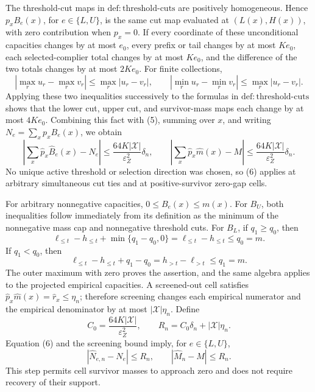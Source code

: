 The threshold-cut maps in \(\mathrm{def{:}threshold\text{-}cuts}\) are positively homogeneous.  Hence \(p_xB_e(x)\), for \(e\in\{L,U\}\), is the same cut map evaluated at \((L(x),H(x))\), with zero contribution when \(p_x=0\).  If every coordinate of these unconditional capacities changes by at most \(e_0\), every prefix or tail changes by at most \(Ke_0\), each selected-complier total changes by at most \(Ke_0\), and the difference of the two totals changes by at most \(2Ke_0\).  For finite collections,
\[
|\max_r u_r-\max_r v_r|\le\max_r|u_r-v_r|,
\qquad
|\min_r u_r-\min_r v_r|\le\max_r|u_r-v_r|.
\]
Applying these two inequalities successively to the formulas in \(\mathrm{def{:}threshold\text{-}cuts}\) shows that the lower cut, upper cut, and survivor-mass maps each change by at most \(4Ke_0\).  Combining this fact with (5), summing over \(x\), and writing \(N_e=\sum_xp_xB_e(x)\), we obtain
\[
\left|\sum_x\widehat p_x\widehat B_e(x)-N_e\right|
\le\frac{64K|\mathcal X|}{\varepsilon_Z^2}\delta_n,
\qquad
\left|\sum_x\widehat p_x\widehat m(x)-M\right|
\le\frac{64K|\mathcal X|}{\varepsilon_Z^2}\delta_n.
\tag{6}
\]
No unique active threshold or selection direction was chosen, so (6) applies at arbitrary simultaneous cut ties and at positive-survivor zero-gap cells.

For arbitrary nonnegative capacities, \(0\le B_e(x)\le m(x)\).  For \(B_U\), both inequalities follow immediately from its definition as the minimum of the nonnegative mass cap and nonnegative threshold cuts.  For \(B_L\), if \(q_1\ge q_0\), then
\[
\ell_{\le t}-h_{\le t}+\min\{q_1-q_0,0\}
=\ell_{\le t}-h_{\le t}\le q_0=m.
\]
If \(q_1<q_0\), then
\[
\ell_{\le t}-h_{\le t}+q_1-q_0
=h_{>t}-\ell_{>t}\le q_1=m.
\]
The outer maximum with zero proves the assertion, and the same algebra applies to the projected empirical capacities.  A screened-out cell satisfies \(\widehat p_x\widehat m(x)=\widehat r_x\le\eta_n\); therefore screening changes each empirical numerator and the empirical denominator by at most \(|\mathcal X|\eta_n\).  Define
\[
C_0=\frac{64K|\mathcal X|}{\varepsilon_Z^2},
\qquad
R_n=C_0\delta_n+|\mathcal X|\eta_n.
\]
Equation (6) and the screening bound imply, for \(e\in\{L,U\}\),
\[
|\widehat N_{e,n}-N_e|\le R_n,
\qquad
|\widehat M_n-M|\le R_n.
\tag{7}
\]
This step permits cell survivor masses to approach zero and does not require recovery of their support.


